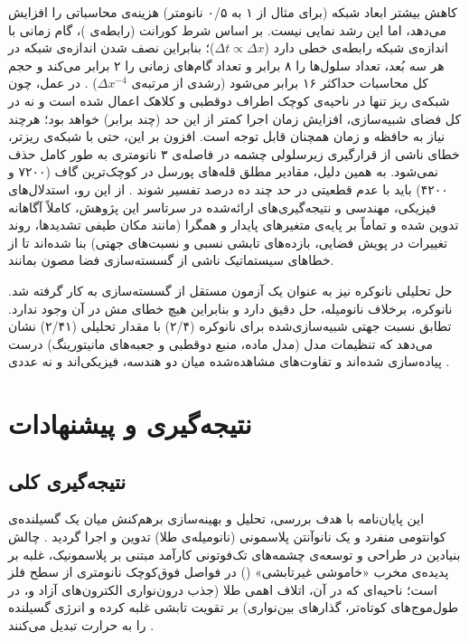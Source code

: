 \documentclass[12pt,a4paper]{report}
\begin{document}
کاهش بیشتر ابعاد شبکه (برای مثال از ۱ به ۰/۵ نانومتر) هزینه‌ی محاسباتی را افزایش می‌دهد، اما این رشد نمایی نیست. بر اساس شرط کورانت (رابطه‌ی )، گام زمانی با اندازه‌ی شبکه رابطه‌ی خطی دارد ($\Delta t\propto\Delta x$)؛ بنابراین نصف شدن اندازه‌ی شبکه در هر سه بُعد، تعداد سلول‌ها را ۸ برابر و تعداد گام‌های زمانی را ۲ برابر می‌کند و حجم کل محاسبات حداکثر ۱۶ برابر می‌شود (رشدی از مرتبه‌ی $\Delta x^{-4}$) \cite{taflove}. در عمل، چون شبکه‌ی ریز تنها در ناحیه‌ی کوچک  اطراف دوقطبی و کلاهک اعمال شده است و نه در کل فضای شبیه‌سازی، افزایش زمان اجرا کمتر از این حد (چند برابر) خواهد بود؛ هرچند نیاز به حافظه و زمان همچنان قابل توجه است. افزون بر این، حتی با شبکه‌ی ریزتر، خطای ناشی از قرارگیری زیرسلولی چشمه در فاصله‌ی ۳ نانومتری به طور کامل حذف نمی‌شود. به همین دلیل، مقادیر مطلق قله‌های پورسل در کوچک‌ترین گاف (۷۲۰۰ و ۴۲۰۰) باید با عدم قطعیتی در حد چند ده درصد تفسیر شوند \cite{taflove}. از این رو، استدلال‌های فیزیکی، مهندسی و نتیجه‌گیری‌های ارائه‌شده در سرتاسر این پژوهش، کاملاً آگاهانه تدوین شده و تماماً بر پایه‌ی متغیرهای پایدار و همگرا (مانند مکان طیفی تشدیدها، روند تغییرات در پویش فضایی، بازده‌های تابشی نسبی و نسبت‌های جهتی) بنا شده‌اند تا از خطاهای سیستماتیک ناشی از گسسته‌سازی فضا مصون بمانند.

حل تحلیلی نانوکره نیز به عنوان یک آزمون مستقل از گسسته‌سازی به کار گرفته شد. نانوکره، برخلاف نانومیله، حل دقیق دارد و بنابراین هیچ خطای مش در آن وجود ندارد. تطابق نسبت جهتی شبیه‌سازی‌شده برای نانوکره (۲/۴) با مقدار تحلیلی (۲/۴۱) نشان می‌دهد که تنظیمات مدل  (مدل ماده، منبع دوقطبی و جعبه‌های مانیتورینگ) درست پیاده‌سازی شده‌اند و تفاوت‌های مشاهده‌شده میان دو هندسه، فیزیکی‌اند و نه عددی \cite{ruppin,mertens}.

\chapter{نتیجه‌گیری و پیشنهادات}

\section{نتیجه‌گیری کلی}
این پایان‌نامه با هدف بررسی، تحلیل و بهینه‌سازی برهم‌کنش میان یک گسیلنده‌ی کوانتومی منفرد و یک نانوآنتن پلاسمونی (نانومیله‌ی طلا) تدوین و اجرا گردید \cite{novotny,maier}. چالش بنیادین در طراحی و توسعه‌ی چشمه‌های تک‌فوتونی کارآمد مبتنی بر پلاسمونیک، غلبه بر پدیده‌ی مخرب «خاموشی غیرتابشی» () در فواصل فوق‌کوچک نانومتری از سطح فلز است؛ ناحیه‌ای که در آن، اتلاف اهمی طلا (جذب درون‌نواری الکترون‌های آزاد و، در طول‌موج‌های کوتاه‌تر، گذارهای بین‌نواری) بر تقویت تابشی غلبه کرده و انرژی گسیلنده را به حرارت تبدیل می‌کنند \cite{novotny,anger}.
\end{document}
